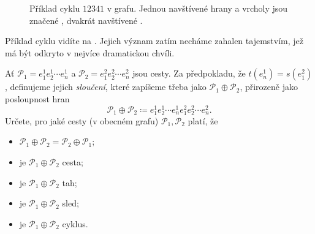 \begin{figure}[h]
 \centering
 \caption{Příklad cyklu $12341$ v grafu. Jednou navštívené hrany a vrcholy jsou
 značené , dvakrát navštívené .}
 \label{fig:priklad-cyklu}
\end{figure}

Příklad cyklu vidíte na . Jejich význam zatím
necháme zahalen tajemstvím, jež má být odkryto v nejvíce dramatickou chvíli.

\begin{exercise}
 Ať $\mathcal{P}_1 = e_1^{1}e_2^{1}\cdots e_n^{1}$ a $\mathcal{P}_2 =
 e_1^2e_2^2\cdots e_n^2$ jsou cesty. Za předpokladu, že $t(e_n^{1}) = s(e_1^2)$,
 definujeme jejich \emph{sloučení}, které zapíšeme třeba jako $\mathcal{P}_1
 \oplus \mathcal{P}_2$, přirozeně jako posloupnost hran
 \[
  \mathcal{P}_1 \oplus \mathcal{P}_2 \coloneqq e_1^{1}e_2^{1}\cdots
  e_n^{1}e_1^2e_2^2\cdots e_n^2.
 \]
 Určete, pro jaké cesty (v obecném grafu) $\mathcal{P}_1, \mathcal{P}_2$ platí,
 že
 \begin{itemize}
  \item $\mathcal{P}_1 \oplus \mathcal{P}_2 = \mathcal{P}_2 \oplus
   \mathcal{P}_1$;
  \item je $\mathcal{P}_1 \oplus \mathcal{P}_2$ cesta;
  \item je $\mathcal{P}_1 \oplus \mathcal{P}_2$ tah;
  \item je $\mathcal{P}_1 \oplus \mathcal{P}_2$ sled;
  \item je $\mathcal{P}_1 \oplus \mathcal{P}_2$ cyklus.
 \end{itemize}
\end{exercise}
